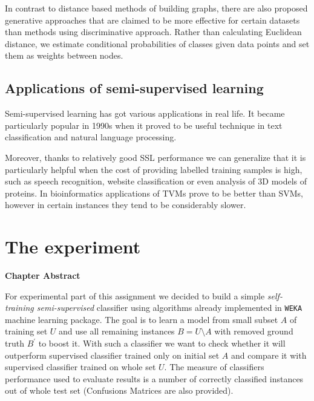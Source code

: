 \documentclass[12pt, a4paper, pdflatex]{report}
\newenvironment{chapabstract}
{
	\vspace{0.5cm}
	\small
	\begin{center}
    \bfseries Chapter Abstract
    \end{center}
}{\vspace{1.5cm}}
\begin{document}
In contrast to distance based methods of building graphs, there are also proposed generative approaches that are claimed to be more effective for certain datasets than methods using discriminative approach\cite{He07}. Rather than calculating Euclidean distance, we estimate conditional probabilities of classes given data points and set them as weights between nodes. 

\section{Applications of semi-supervised learning}
Semi-supervised learning has got various applications in real life. It became particularly popular in 1990s when it proved to be useful technique in text classification and natural language processing\cite{chapelle06}. 

Moreover, thanks to relatively good SSL performance we can generalize that it is particularly helpful when the cost of providing labelled training samples is high, such as speech recognition, website classification or even analysis of 3D models of proteins. In bioinformatics applications of TVMs prove to be better than SVMs, however in certain instances they tend to be considerably slower\cite{chapelle06}.







\chapter{The experiment}

\begin{chapabstract}
For experimental part of this assignment we decided to build a simple \emph{self-training semi-supervised} classifier using algorithms already implemented in \texttt{WEKA} machine learning package. The goal is to learn a model from small subset $A$ of training set $U$ and use all remaining instances $B = U \setminus A$ with removed ground truth $B^{\prime}$ to boost it. With such a classifier we want to check whether it will outperform supervised classifier trained only on initial set $A$ and compare it with supervised classifier trained on whole set $U$. The measure of classifiers performance used to evaluate results is a number of correctly classified instances out of whole test set (Confusions Matrices are also provided).
\end{chapabstract}
\end{document}
